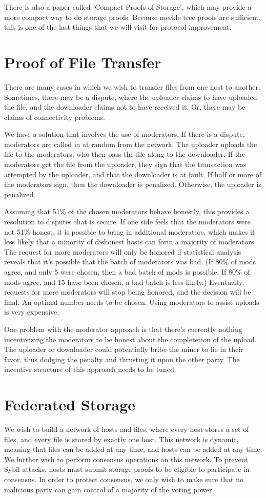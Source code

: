 \documentclass[twocolumn]{article}
\begin{document}
There is also a paper called 'Compact Proofs of Storage', which may provide a more compact way to do storage proofs.
Because merkle tree proofs are sufficient, this is one of the last things that we will visit for protocol improvement.

\section{Proof of File Transfer}
There are many cases in which we wish to transfer files from one host to another.
Sometimes, there may be a dispute, where the uploader claims to have uploaded the file, and the downloader claims not to have received it.
Or, there may be claims of connectivity problems.

We have a solution that involves the use of moderators.
If there is a dispute, moderators are called in at random from the network.
The uploader uploads the file to the moderators, who then pass the file along to the downloader.
If the moderators get the file from the uploader, they sign that the transaction was attempted by the uploader, and that the downloader is at fault.
If half or more of the moderators sign, then the downloader is penalized.
Otherwise, the uploader is penalized.

Assuming that 51\% of the chosen moderators behave honestly, this provides a resolution to disputes that is secure.
If one side feels that the moderators were not 51\% honest, it is possible to bring in additional moderators, which makes it less likely that a minority of dishonest hosts can form a majority of moderators.
The request for more moderators will only be honored if statistical analysis reveals that it's possible that the batch of moderators was bad. (If 80\% of mods agree, and only 5 were chosen, then a bad batch of mods is possible. If 80\% of mods agree, and 15 have been chosen, a bad batch is less likely.)
Eventually, requests for more moderators will stop being honored, and the decision will be final.
An optimal number needs to be chosen.
Using moderators to assist uploads is very expensive.

One problem with the moderator approach is that there's currently nothing incentivizing the moderators to be honest about the completetion of the upload.
The uploader or downloader could potentially bribe the miner to lie in their favor, thus dodging the penalty and thrusting it upon the other party.
The incentive structure of this approach needs to be tuned.

\section{Federated Storage}
We wish to build a network of hosts and files, where every host stores a set of files, and every file is stored by exactly one host.
This network is dynamic, meaning that files can be added at any time, and hosts can be added at any time.
We further wish to perform consensus operations on this network.
To prevent Sybil attacks, hosts must submit storage proofs to be eligible to participate in consensus.
In order to protect consensus, we only wish to make sure that no malicious party can gain control of a majority of the voting power.
\end{document}
